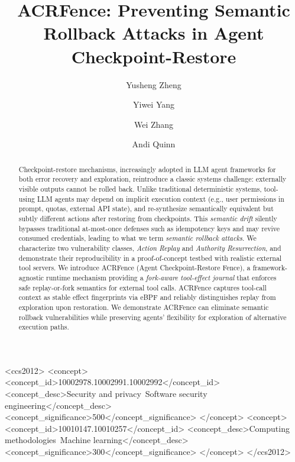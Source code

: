 \documentclass[sigplan,nonacm]{acmart}
\newcommand{\sys}{ACRFence}
\begin{document}
\title{\sys{}: Preventing Semantic Rollback Attacks in Agent Checkpoint-Restore}

\author{Yusheng Zheng}

\author{Yiwei Yang}

\author{Wei Zhang}

\author{Andi Quinn}


\begin{abstract}
	Checkpoint-restore mechanisms, increasingly adopted in LLM agent frameworks for both error recovery and exploration, reintroduce a classic systems challenge: externally visible outputs cannot be rolled back. Unlike traditional deterministic systems, tool-using LLM agents may depend on implicit execution context (e.g., user permissions in prompt, quotas, external API state), and re-synthesize semantically equivalent but subtly different actions after restoring from checkpoints. This \emph{semantic drift} silently bypasses traditional at-most-once defenses such as idempotency keys and may revive consumed credentials, leading to what we term \emph{semantic rollback attacks}. We characterize two vulnerability classes, \emph{Action Replay} and \emph{Authority Resurrection}, and demonstrate their reproducibility in a proof-of-concept testbed with realistic external tool servers. We introduce \sys{} (Agent Checkpoint-Restore Fence), a framework-agnostic runtime mechanism providing a \emph{fork-aware tool-effect journal} that enforces safe replay-or-fork semantics for external tool calls. \sys{} captures tool-call context as stable effect fingerprints via eBPF and reliably distinguishes replay from exploration upon restoration. We demonstrate \sys{} can eliminate semantic rollback vulnerabilities while preserving agents' flexibility for exploration of alternative execution paths.
\end{abstract}

\begin{CCSXML}
<ccs2012>
   <concept>
       <concept_id>10002978.10002991.10002992</concept_id>
       <concept_desc>Security and privacy~Software security engineering</concept_desc>
       <concept_significance>500</concept_significance>
   </concept>
   <concept>
       <concept_id>10010147.10010257</concept_id>
       <concept_desc>Computing methodologies~Machine learning</concept_desc>
       <concept_significance>300</concept_significance>
   </concept>
</ccs2012>
\end{CCSXML}
\end{document}
